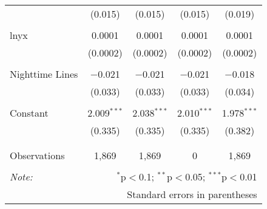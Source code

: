 \begin{table}[!htbp]
\begin{tabular}{@{\extracolsep{5pt}}lcccc}
  & (0.015) & (0.015) & (0.015) & (0.019) \\ 
  & & & & \\ 
 lnyx & 0.0001 & 0.0001 & 0.0001 & 0.0001 \\ 
  & (0.0002) & (0.0002) & (0.0002) & (0.0002) \\ 
  & & & & \\ 
 Nighttime Lines & $-$0.021 & $-$0.021 & $-$0.021 & $-$0.018 \\ 
  & (0.033) & (0.033) & (0.033) & (0.034) \\ 
  & & & & \\ 
 Constant & 2.009$^{***}$ & 2.038$^{***}$ & 2.010$^{***}$ & 1.978$^{***}$ \\ 
  & (0.335) & (0.335) & (0.335) & (0.382) \\ 
  & & & & \\ 
\hline \\[-1.8ex] 
Observations & 1,869 & 1,869 & 0 & 1,869 \\ 
\hline 
\hline \\[-1.8ex] 
\textit{Note:}  & \multicolumn{4}{r}{$^{*}$p$<$0.1; $^{**}$p$<$0.05; $^{***}$p$<$0.01} \\ 
 & \multicolumn{4}{r}{Standard errors in parentheses} \\ 
\end{tabular} 
\end{table} 
